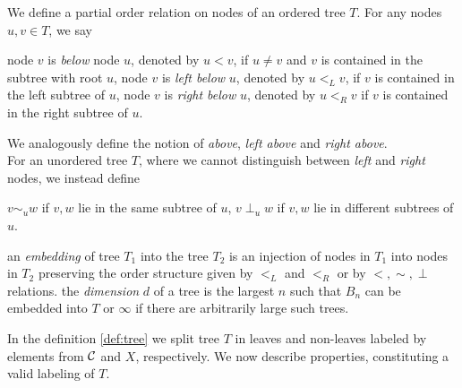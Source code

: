 \begin{definition}
We define a partial order relation on nodes of an ordered tree $T$. For any nodes $u,v\in T$, we say
    \begin{outline}
    \1 node $v$ is \emph{below} node $u$, denoted by $u<v$, if $u\neq v$ and $v$ is contained in the subtree with root $u$, 
    \1 node $v$ is \emph{left below} $u$, denoted by $u <_L v$, if $v$ is contained in the left subtree of $u$,
    \1 node $v$ is \emph{right below} $u$, denoted by $u <_R v$ if $v$ is contained in the right subtree of $u$.
    \end{outline}
We analogously define the notion of \emph{above}, \emph{left above} and \emph{right above}.\\
For an unordered tree $T$, where we cannot distinguish between \emph{left} and \emph{right} nodes, we instead define
    \begin{outline}
    \1 $v\sim_u w$ if $v,w$ lie in the same subtree of $u$,
    \1 $v\perp_u w$ if $v,w$ lie in different subtrees of $u$.
    \end{outline}
\end{definition}

\begin{definition}
\label{def:treeembed}
\marginnote[0cm]{}
\begin{outline}
    \1 an \emph{embedding} of tree $T_1$ into the tree $T_2$ is an injection of nodes in $T_1$ into nodes in $T_2$ preserving the order structure given by $<_L$ and $<_R$ or by $<, \sim, \perp$ relations.
    \1 the \emph{dimension} $d$ of a tree is the largest $n$ such that $B_n$ can be embedded into $T$ or $\infty$ if there are arbitrarily large such trees. 
\end{outline}
\end{definition}

In the definition \ref{def:tree} we split tree $T$ in leaves and non-leaves labeled by elements from $\mathcal{C}$ and $X$, respectively. We now describe properties, constituting a valid labeling of $T$.

